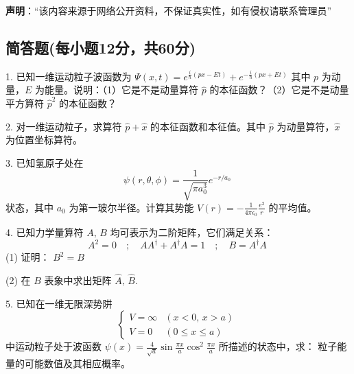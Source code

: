 
\textbf{声明}：“该内容来源于网络公开资料，不保证真实性，如有侵权请联系管理员”

\subsection{简答题(每小题12分，共60分)}
1. 已知一维运动粒子波函数为
$ \Psi(x, t) = e^{\frac{i}{\hbar}(px - Et)} + e^{-\frac{i}{\hbar}(px + Et)}$ 
其中 $p$ 为动量，$E$ 为能量。说明：（1）它是不是动量算符 $\hat{p}$ 的本征函数？（2）它是不是动量平方算符 $\hat{p}^2$ 的本征函数？

2. 对一维运动粒子，求算符 $\hat{p} +\hat{x}$ 的本征函数和本征值。其中 $\hat{p}$ 为动量算符，$\hat{x}$ 为位置坐标算符。

3. 已知氢原子处在
$$ \psi(r, \theta, \phi) = \frac{1}{\sqrt{\pi a_0^3}} e^{-r/a_0}~$$ 
状态，其中 $a_0$ 为第一玻尔半径。计算其势能 $V(r) = -\frac{1}{4\pi \epsilon_0} \frac{e^2}{r}$ 的平均值。

4. 已知力学量算符 $A, \, B$ 均可表示为二阶矩阵，它们满足关系：
$$A^2 = 0 \quad ; \quad AA^{\dagger} + A^{\dagger}A = 1 \quad ; \quad B = A^{\dagger}A~$$
(1) 证明： $B^2 = B$

(2) 在 $B$ 表象中求出矩阵 $\hat{A}, \, \hat{B}$.

5. 已知在一维无限深势阱
$$
\begin{cases}
V = \infty & (x < 0, \, x > a) \\
V = 0 & (0 \leq x \leq a)
\end{cases}~
$$
中运动粒子处于波函数 $\psi(x) = \frac{4}{\sqrt{a}} \sin{\frac{\pi x}{a}} \cos^2{\frac{\pi x}{a}}$ 所描述的状态中，求：
粒子能量的可能数值及其相应概率。

